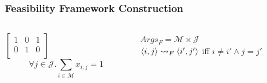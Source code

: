 \documentclass[11pt]{beamer}
\begin{document}
	\begin{frame}
		\frametitle{Feasibility Framework Construction}
				
		\begin{columns}
			\begin{column}{0.5\textwidth}
				\begin{center}
					$\begin{bmatrix}
						1 & 0 & 1\\
						0 & 1 & 0\\
					\end{bmatrix}$
					\begin{equation*}
						\forall j\in\mathcal{J}.\sum_{i\in\mathcal{M}}x_{i,j}=1
					\end{equation*}
				\end{center}
			\end{column}
			\begin{column}{0.5\textwidth}
				\begin{center}
					$Args_F=\mathcal{M}\times\mathcal{J}$\\
					$\langle{i},{j}\rangle\rightsquigarrow_F\langle{i'},{j'}\rangle$ iff $i\neq i'\land j=j'$
				\end{center}
			\end{column}
		\end{columns}
	\end{frame}
\end{document}
